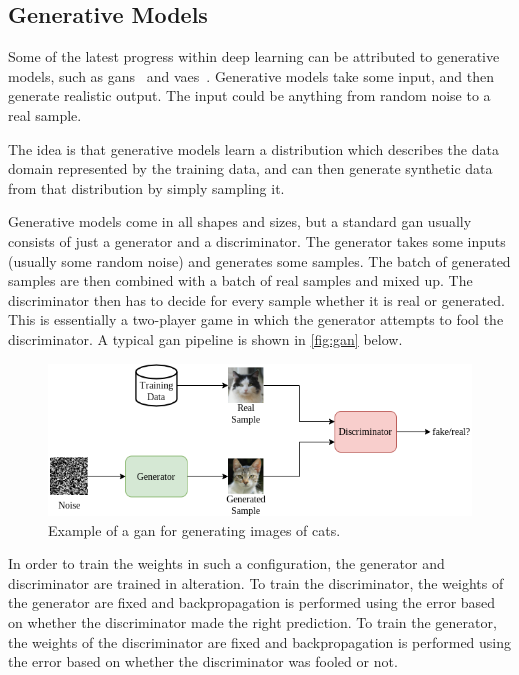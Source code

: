 \subsection{Generative Models}
Some of the latest progress within deep learning can be attributed to generative models, such as \glspl*{gan}~\cite{gan} and \glspl*{vae}~\cite{vae}. Generative models take some input, and then generate realistic output. The input could be anything from random noise to a real sample.
\par
The idea is that generative models learn a distribution which describes the data domain represented by the training data, and can then generate synthetic data from that distribution by simply sampling it.
\par
Generative models come in all shapes and sizes, but a standard \gls*{gan} usually consists of just a generator and a discriminator. The generator takes some inputs (usually some random noise) and generates some samples. The batch of generated samples are then combined with a batch of real samples and mixed up. The discriminator then has to decide for every sample whether it is real or generated. This is essentially a two-player game in which the generator attempts to fool the discriminator. A typical \gls*{gan} pipeline is shown in \autoref{fig:gan} below.
\begin{figure}[H]
    \centering
    \includegraphics[width=\linewidth]{resources/related_works/gan.png}
    \caption[Gan Example]{Example of a \gls*{gan} for generating images of cats.}
    \label{fig:gan}
\end{figure}
In order to train the weights in such a configuration, the generator and discriminator are trained in alteration. To train the discriminator, the weights of the generator are fixed and backpropagation is performed using the error based on whether the discriminator made the right prediction. To train the generator, the weights of the discriminator are fixed and backpropagation is performed using the error based on whether the discriminator was fooled or not.
\par
